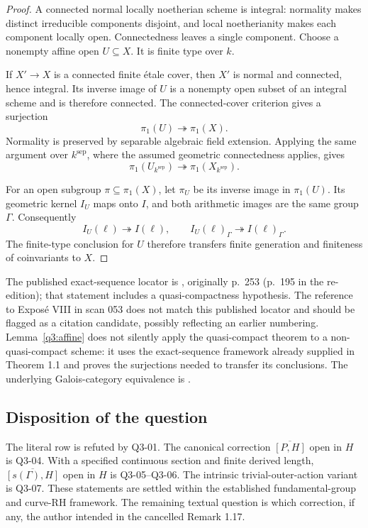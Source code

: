 \documentclass[11pt,a4paper]{article}
\theoremstyle{remark}
\begin{document}
\begin{proof}
A connected normal locally noetherian scheme is integral:
normality makes distinct irreducible components disjoint, and
local noetherianity makes each component locally open.
Connectedness leaves a single component.  Choose a nonempty
affine open \(U\subseteq X\).  It is finite type over \(k\).

If \(X'\to X\) is a connected finite étale cover, then \(X'\)
is normal and connected, hence integral.  Its inverse image of
\(U\) is a nonempty open subset of an integral scheme and is
therefore connected.  The connected-cover criterion
\cite[V, Proposition 6.9]{SGA1} gives a surjection
\[
\pi_1(U)\twoheadrightarrow\pi_1(X).
\]
Normality is preserved by separable algebraic field extension.
Applying the same argument over \(k^{\mathrm{sep}}\), where the
assumed geometric connectedness applies, gives
\[
\pi_1(U_{k^{\mathrm{sep}}})
\twoheadrightarrow\pi_1(X_{k^{\mathrm{sep}}}).
\]

For an open subgroup \(\pi\subseteq\pi_1(X)\), let \(\pi_U\)
be its inverse image in \(\pi_1(U)\).  Its geometric kernel
\(I_U\) maps onto \(I\), and both arithmetic images are the same
group \(\Gamma\).  Consequently
\[
I_U(\ell)\twoheadrightarrow I(\ell),\qquad
I_U(\ell)_\Gamma\twoheadrightarrow I(\ell)_\Gamma.
\]
The finite-type conclusion for \(U\) therefore transfers finite
generation and finiteness of coinvariants to \(X\).
\end{proof}

The published exact-sequence locator is
\cite[IX, Theorem 6.1]{SGA1}, originally p.~253
(p.~195 in the re-edition); that statement includes a
quasi-compactness hypothesis.  The reference to Exposé VIII in
scan 053 does not match this published locator and should be
flagged as a citation candidate, possibly reflecting an earlier
numbering.  Lemma~\ref{q3:affine} does not silently apply the
quasi-compact theorem to a non-quasi-compact scheme: it uses the
exact-sequence framework already supplied in Theorem 1.1 and
proves the surjections needed to transfer its conclusions.
The underlying Galois-category equivalence is
\cite[V, Theorem 4.1]{SGA1}.

\subsection{Disposition of the question}

The literal row is refuted by Q3-01.  The canonical correction
\(\overline{[P,H]}\) open in \(H\) is Q3-04.  With a specified
continuous section and finite derived length,
\(\overline{[s(\Gamma),H]}\) open in \(H\) is Q3-05--Q3-06.
The intrinsic trivial-outer-action variant is Q3-07.
These statements are settled within the established
fundamental-group and curve-RH framework.  The remaining textual
question is which correction, if any, the author intended in the
cancelled Remark 1.17.
\end{document}
